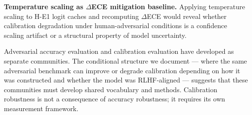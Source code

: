 \textbf{Temperature scaling as $\Delta$ECE mitigation baseline.} Applying temperature scaling to H-E1 logit caches and recomputing $\Delta$ECE would reveal whether calibration degradation under human-adversarial conditions is a confidence scaling artifact or a structural property of model uncertainty.

Adversarial accuracy evaluation and calibration evaluation have developed as separate communities. The conditional structure we document --- where the same adversarial benchmark can improve or degrade calibration depending on how it was constructed and whether the model was RLHF-aligned --- suggests that these communities must develop shared vocabulary and methods. Calibration robustness is not a consequence of accuracy robustness; it requires its own measurement framework.
